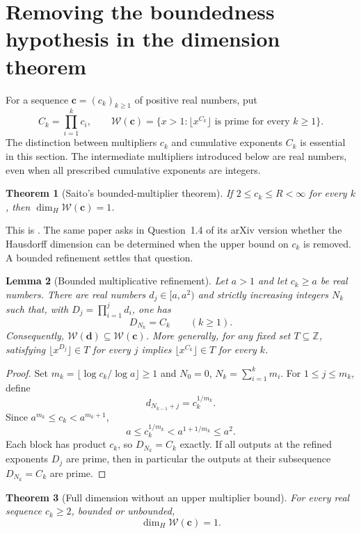 \documentclass[11pt,a4paper]{article}
\newtheorem{theorem}{Theorem}[section]
\newtheorem{lemma}[theorem]{Lemma}
\theoremstyle{definition}
\theoremstyle{remark}
\numberwithin{equation}{section}
\begin{document}
\section{Removing the boundedness hypothesis in the dimension theorem}
\label{fol:sec:interpolation}

For a sequence $\mathbf c=(c_k)_{k\ge1}$ of positive real numbers, put
\[
 C_k=\prod_{i=1}^k c_i,
 \qquad
 \mathcal W(\mathbf c)
 =\{x>1:\lfloor x^{C_k}\rfloor\text{ is prime for every }k\ge1\}.
\]
The distinction between multipliers $c_k$ and cumulative exponents $C_k$
is essential in this section. The intermediate multipliers introduced below
are real numbers, even when all prescribed cumulative exponents are integers.

\begin{theorem}[Saito's bounded-multiplier theorem]\label{fol:thm:saito-bounded}
If $2\le c_k\le R<\infty$ for every $k$, then
$\dim_H\mathcal W(\mathbf c)=1$.
\end{theorem}

This is \cite[Theorem~1.2]{SaitoDimension2021}. The same paper asks in
Question~1.4 of its arXiv version whether the Hausdorff dimension can be
determined when the upper bound on $c_k$ is removed. A bounded refinement
settles that question.

\begin{lemma}[Bounded multiplicative refinement]\label{fol:lem:bounded-refinement}
Let $a>1$ and let $c_k\ge a$ be real numbers. There are real numbers
$d_j\in[a,a^2)$ and strictly increasing integers $N_k$ such that, with
$D_j=\prod_{i=1}^j d_i$, one has
\[
 D_{N_k}=C_k\qquad(k\ge1).
\]
Consequently, $\mathcal W(\mathbf d)\subseteq\mathcal W(\mathbf c)$.
More generally, for any fixed set $T\subseteq\mathbb Z$, satisfying
$\lfloor x^{D_j}\rfloor\in T$ for every $j$ implies
$\lfloor x^{C_k}\rfloor\in T$ for every $k$.
\end{lemma}

\begin{proof}
Set $m_k=\lfloor\log c_k/\log a\rfloor\ge1$ and
$N_0=0$, $N_k=\sum_{i=1}^k m_i$. For $1\le j\le m_k$, define
\[
 d_{N_{k-1}+j}=c_k^{1/m_k}.
\]
Since $a^{m_k}\le c_k<a^{m_k+1}$,
\[
 a\le c_k^{1/m_k}<a^{1+1/m_k}\le a^2.
\]
Each block has product $c_k$, so $D_{N_k}=C_k$ exactly.
If all outputs at the refined exponents $D_j$ are prime, then in particular
the outputs at their subsequence $D_{N_k}=C_k$ are prime.
\end{proof}

\begin{theorem}[Full dimension without an upper multiplier bound]
\label{fol:thm:unbounded-dimension}
For every real sequence $c_k\ge2$, bounded or unbounded,
\[
 \boxed{\dim_H\mathcal W(\mathbf c)=1.}
\]
\end{theorem}
\end{document}
